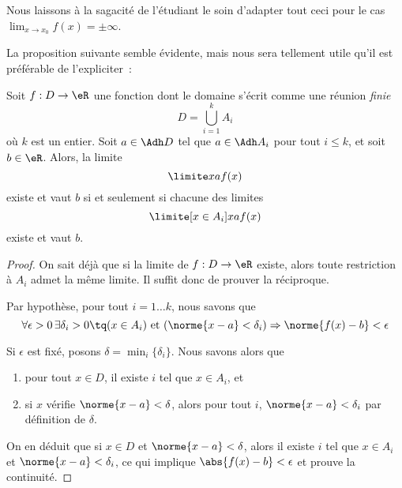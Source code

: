 Nous laissons à la sagacité de l'étudiant le soin d'adapter tout ceci pour le cas $\lim_{x\to x_0}f(x)=\pm\infty$.

La proposition suivante semble évidente, mais nous sera tellement
utile qu'il est préférable de l'expliciter~:
\begin{proposition}
Soit $f : D \to \eR$ une fonction dont le domaine
  s'écrit comme une réunion \emph{finie}
  \begin{equation*}
    D = \bigcup_{i=1}^k A_i
  \end{equation*}  
  où $k$ est un entier. Soit $a \in \Adh D$ tel que $a \in \Adh A_i$
  pour tout $i \leq k$, et soit $b \in \eR$. Alors, la limite
  \begin{equation*}
    \limite x a f(x)
  \end{equation*}
  existe et vaut $b$ si et seulement si chacune des limites
  \begin{equation*}
    \limite[x \in A_i] x a f(x)
  \end{equation*}
  existe et vaut $b$.
\end{proposition}

\begin{proof}On sait déjà que si la limite de $f : D \to \eR$
  existe, alors toute restriction à $A_i$ admet la même limite. Il
  suffit donc de prouver la réciproque.

  Par hypothèse, pour tout $i = 1 \ldots k$, nous savons que
  \begin{equation*}
    \forall \epsilon > 0\, \exists \delta_i > 0 \tq (x \in A_i)
    \text{ et }
    (\norme{x-a} < \delta_i) \Rightarrow \norme{f(x) - b} < \epsilon
  \end{equation*}

  Si $\epsilon$ est fixé, posons $\delta = \min_i\{\delta_i\}$. Nous
  savons alors que
  \begin{enumerate}
  \item pour tout $x \in D$, il existe $i$ tel que $x \in A_i$, et
  \item si $x$ vérifie $\norme{x-a} < \delta$, alors pour tout $i$,
    $\norme{x-a} < \delta_i$ par définition de $\delta$.
  \end{enumerate}
  
  On en déduit que si $x \in D$ et $\norme{x-a} < \delta$, alors il
  existe $i$ tel que $x \in A_i$ et $\norme{x-a} < \delta_i$, ce qui
  implique $\abs{f(x) - b} < \epsilon$ et prouve la continuité.
\end{proof}

